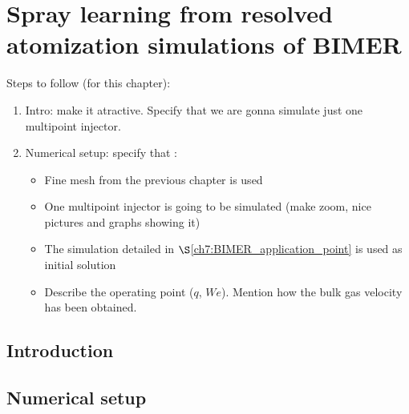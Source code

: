 \chapter{Spray learning from resolved atomization simulations of BIMER}
	\label{ch8:bimer_resolved_atomization}

Steps to follow (for this chapter):

\begin{enumerate}

	\item Intro: make it atractive. Specify that we are gonna simulate just one multipoint injector.
	
	\item Numerical setup: specify that :

		\begin{itemize}
		
			\item Fine mesh from the previous chapter is used
			
			\item One multipoint injector is going to be simulated (make zoom, nice pictures and graphs showing it)
			
			\item The simulation detailed in $\S$\ref{ch7:BIMER_application_point} is used as initial solution
			
			\item Describe the operating point ($q$, $We$). Mention how the bulk gas velocity has been obtained.
		
		\end{itemize}
	
\end{enumerate}


\section{Introduction}



\section{Numerical setup}


